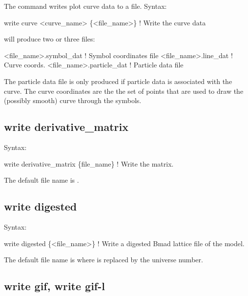 {{{{{{{{{The  command writes plot curve data to a file.
Syntax:
\begin{example}
    write curve <curve_name> \{<file_name>\} ! Write the curve data
\end{example}

 will produce two or three files:
\begin{example}
  <file_name>.symbol_dat    ! Symbol coordinates file
  <file_name>.line_dat      ! Curve coords.
  <file_name>.particle_dat  ! Particle data file
\end{example}
The particle data file is only produced if particle data is associated with the curve.  The curve
coordinates are the the set of points that are used to draw the (possibly smooth) curve through the
symbols.



\subsection{write derivative_matrix}
\label{s:write.deriv.matrix}

Syntax:
\begin{example}
    write derivative_matrix \{file_name\}    ! Write the  matrix.
\end{example}

The default file name is . 


\subsection{write digested}
\label{s:write.digested}

Syntax:
\begin{example}
    write digested \{<file_name>\}      ! Write a digested Bmad lattice file of the model.
\end{example}

The default file name is  where \vn{\#} is replaced by the universe number. 



\subsection{write gif, write gif-l}
\label{s:write.gif}

}}}}}}}}}
